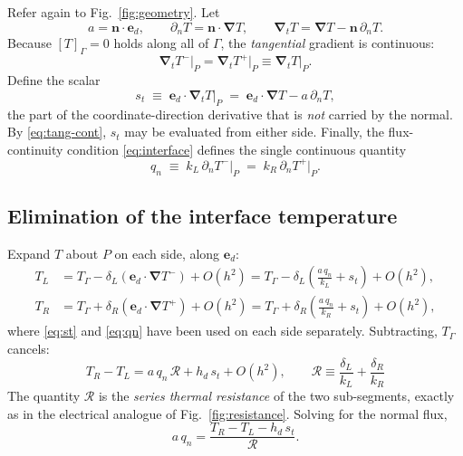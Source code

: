 \documentclass[11pt,a4paper]{article}
\newcommand{\jump}[1]{\left[#1\right]}
\newcommand{\ed}{\boldsymbol{e}_d}
\newcommand{\nn}{\boldsymbol{n}}
\newcommand{\grad}{\boldsymbol{\nabla}}
\newcommand{\Rser}{\mathcal{R}}
\begin{document}
Refer again to Fig.~\ref{fig:geometry}. Let
\begin{equation}
  a=\nn\cdot\ed,
  \qquad
  \partial_nT = \nn\cdot\grad T,
  \qquad
  \grad_t T = \grad T-\nn\,\partial_n T .
\end{equation}
Because $\jump{T}_\Gamma=0$ holds along all of $\Gamma$, the \emph{tangential}
gradient is continuous:
\begin{equation}
  \grad_tT^{-}\big|_P = \grad_tT^{+}\big|_P \equiv \grad_tT\big|_P .
  \label{eq:tang-cont}
\end{equation}
Define the scalar
\begin{equation}
  s_t \;\equiv\; \ed\cdot\grad_tT\big|_P
     \;=\; \ed\cdot\grad T - a\,\partial_nT ,
  \label{eq:st}
\end{equation}
the part of the coordinate-direction derivative that is \emph{not} carried by
the normal. By \eqref{eq:tang-cont}, $s_t$ may be evaluated from either side.
Finally, the flux-continuity condition \eqref{eq:interface} defines the single
continuous quantity
\begin{equation}
  q_n \;\equiv\; k_L\,\partial_nT^{-}\big|_P \;=\; k_R\,\partial_nT^{+}\big|_P .
  \label{eq:qn}
\end{equation}

\subsection{Elimination of the interface temperature}

Expand $T$ about $P$ on each side, along $\ed$:
\begin{align}
  T_L &= T_\Gamma - \delta_L\left(\ed\cdot\grad T^{-}\right)+O(h^2)
       = T_\Gamma - \delta_L\left(\frac{a\,q_n}{k_L}+s_t\right)+O(h^2),
       \label{eq:TL}\\
  T_R &= T_\Gamma + \delta_R\left(\ed\cdot\grad T^{+}\right)+O(h^2)
       = T_\Gamma + \delta_R\left(\frac{a\,q_n}{k_R}+s_t\right)+O(h^2),
       \label{eq:TR}
\end{align}
where \eqref{eq:st} and \eqref{eq:qn} have been used on each side separately.
Subtracting, $T_\Gamma$ cancels:
\begin{equation}
  \boxed{\;
  T_R-T_L = a\,q_n\,\Rser + h_d\,s_t + O(h^2),
  \qquad
  \Rser \equiv \frac{\delta_L}{k_L}+\frac{\delta_R}{k_R} \; }
  \label{eq:master}
\end{equation}
The quantity $\Rser$ is the \emph{series thermal resistance} of the two
sub-segments, exactly as in the electrical analogue of
Fig.~\ref{fig:resistance}. Solving for the normal flux,
\begin{equation}
  a\,q_n = \frac{T_R-T_L-h_d\,s_t}{\Rser}.
  \label{eq:qn-solved}
\end{equation}
\end{document}
